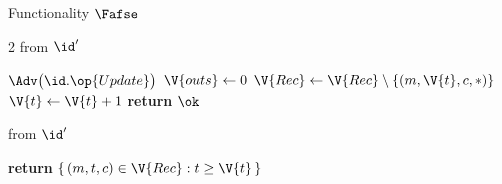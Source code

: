 \begin{interface}[nofloat]{Functionality $\Fafse$ \\
}
{\begin{multicols}{2}
 \quad from $\id'$
\begin{algorithmic}[1]
\algcont
{}
\State $\Adv\bigl(\id.\op{Update}\bigr)$
  \State $\V{outs} \gets 0$
\EndIf
\State $\V{Rec} \gets \V{Rec} \setminus \{(m, \V{t}, c, *)\}$ \label{ln:afseforget}
\State $\V{t} \gets \V{t} + 1$ \label{ln:afsetick}
\State \textbf{return} $\ok$
\algsave
\end{algorithmic}
\vspace{1.4ex}

 \quad from $\id'$
\begin{algorithmic}[1]
\algcont
{}
\State \textbf{return} $\{\, (m,t,c) \in \V{Rec} : t \geq \V{t} \,\}$ \label{ln:afseforward}
\algsave
\end{algorithmic}
\end{multicols}}
\end{interface}
